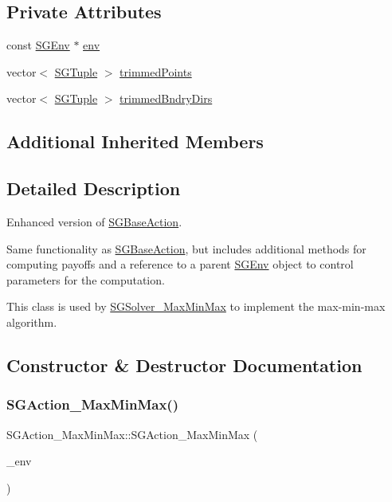 \subsection*{Private Attributes}
\begin{DoxyCompactItemize}
\item 
const \hyperlink{classSGEnv}{S\+G\+Env} $\ast$ \hyperlink{classSGAction__MaxMinMax_a02879e7551a4d8f89d4dece73df79e8e}{env}
\item 
vector$<$ \hyperlink{classSGTuple}{S\+G\+Tuple} $>$ \hyperlink{classSGAction__MaxMinMax_aff074b8925e0e4efbe729a1fa760b574}{trimmed\+Points}
\item 
vector$<$ \hyperlink{classSGTuple}{S\+G\+Tuple} $>$ \hyperlink{classSGAction__MaxMinMax_a775fcd57afc142655d881205242b05b6}{trimmed\+Bndry\+Dirs}
\end{DoxyCompactItemize}
\subsection*{Additional Inherited Members}


\subsection{Detailed Description}
Enhanced version of \hyperlink{classSGBaseAction}{S\+G\+Base\+Action}. 

Same functionality as \hyperlink{classSGBaseAction}{S\+G\+Base\+Action}, but includes additional methods for computing payoffs and a reference to a parent \hyperlink{classSGEnv}{S\+G\+Env} object to control parameters for the computation.

This class is used by \hyperlink{classSGSolver__MaxMinMax}{S\+G\+Solver\+\_\+\+Max\+Min\+Max} to implement the max-\/min-\/max algorithm. 

\subsection{Constructor \& Destructor Documentation}
\mbox{\label{classSGAction__MaxMinMax_a1183e22784f865a0478679874a77425e}} 
\subsubsection{\texorpdfstring{S\+G\+Action\+\_\+\+Max\+Min\+Max()}{SGAction\_MaxMinMax()}\hspace{0.1cm}{\footnotesize\ttfamily [1/3]}}
{\footnotesize\ttfamily S\+G\+Action\+\_\+\+Max\+Min\+Max\+::\+S\+G\+Action\+\_\+\+Max\+Min\+Max (\begin{DoxyParamCaption}\item[{const \hyperlink{classSGEnv}{S\+G\+Env} \&}]{\+\_\+env }\end{DoxyParamCaption})\hspace{0.3cm}{\ttfamily [inline]}}




